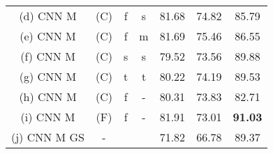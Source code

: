 \documentclass[a4paper,twoside]{article}
\begin{document}
\begin{table*}[!t]
\begin{tabular}{cccc|ccc}
(d) CNN M                                                 & (C)                          & f                        & s                        & 81.68                                                            & 74.82                                                            & 85.79                                                                  \\
(e) CNN M                                                 & (C)                          & f                        & m                        & 81.69                                                            & 75.46                                                            & 86.55                                                                  \\
(f) CNN M                                                 & (C)                          & s                        & s                        & 79.52                                                            & 73.56                                                            & 89.88                                                                  \\
(g) CNN M                                                 & (C)                          & t                        & t                        & 80.22                                                            & 74.19                                                            & 89.53                                                                  \\
(h) CNN M                                                 & (C)                          & f                        & -                        & 80.31                                                            & 73.83                                                            & 82.71                                                                  \\
(i) CNN M                                                 & (F)                          & f                        & -                        & 81.91                                                            & 73.01                                                            & \textbf{91.03}                                                         \\
(j) CNN M GS                                              & -                            &                          &                          & 71.82                                                            & 66.78                                                            & 89.37                                                                  \\

\end{tabular}
\end{table*}
\end{document}
